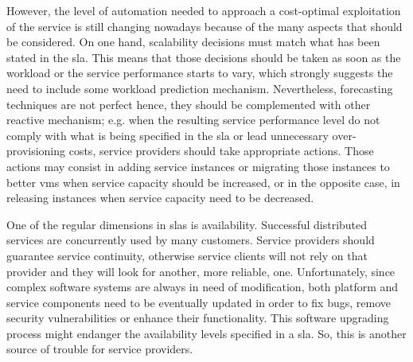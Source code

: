 However, the level of automation needed to approach a cost-optimal exploitation of the service is still
changing nowadays because of the many aspects that should be considered. On one hand, scalability
decisions must match what has been stated in the \ac{sla}. This means that those decisions should be
taken as soon as the workload or the service performance starts to vary, which strongly suggests the
need to include some workload prediction mechanism. Nevertheless, forecasting techniques are not perfect
hence, they should be complemented with other reactive mechanism; e.g. when the resulting service
performance level do not comply with what is being specified in the \ac{sla} or lead unnecessary
over-provisioning costs, service providers should take appropriate actions. Those actions may consist
in adding service instances or migrating those instances to better \ac{vm}s when service capacity
should be increased, or in the opposite case, in releasing instances when service capacity need to be
decreased.

One of the regular dimensions in \ac{sla}s is availability. Successful distributed services are
concurrently used by many customers. Service providers should guarantee service continuity, otherwise
service clients will not rely on that provider and they will look for another, more reliable, one.
Unfortunately, since complex software systems are always in need of modification, both platform and
service components need to be eventually updated in order to fix bugs, remove security vulnerabilities
or enhance their functionality. This software upgrading process might endanger the availability levels
specified in a \ac{sla}. So, this is another source of trouble for service providers.

